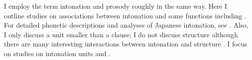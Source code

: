 I employ the term intonation and prosody roughly in the same way.
Here I outline studies on associations between intonation and some functions including .
For detailed phonetic descriptions and analyses of Japanese intonation,
see .%
Also, I only discuss a unit smaller than a clause;
I do not discuss  structure
although there are many interesting interactions between intonation and  structure \cite[e.g.,][]{nakajimaallen93,vendittiswerts96,muraiyamashita99,koisoetal03,okuboetal03,koisoishimoto12}.
I focus on 
studies on intonation units and .

